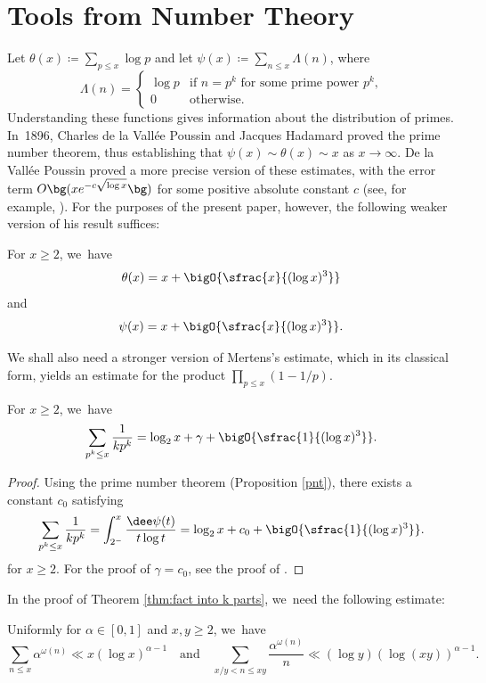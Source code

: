 \section{Tools from Number Theory}
\label{sec:prel}

Let $\theta(x) \coloneqq \sum_{p \le x} \log p$ and let $\psi(x) \coloneqq \sum_{n \le x} \Lambda(n)$, where
\[
\Lambda(n) = \begin{cases}
\log p &\text{if $n = p^k$ for some prime power $p^k$,} \\
0 &\text{otherwise.}
\end{cases}
\]
Understanding these functions gives information about the distribution of primes. In~1896, Charles de la Vallée Poussin and Jacques Hadamard proved the prime number theorem, thus establishing that $\psi(x)\sim\theta(x)\sim x$ as $x\to\infty$. De la Vallée Poussin proved a more precise version of these estimates, with the error term $O\bg(xe^{-c\sqrt{\log x}}\bg)$ for some positive absolute constant $c$ (see, for example, \cite[Ch.\,8]{Koukoulo19}). For the purposes of the present paper, however, the following weaker version of his result suffices:

\begin{prop}
\label{pnt}
For $x \ge 2$, we~have
\[
\theta(x) = x + \bigO{\sfrac{x}{(\log x)^3}}
\]
and
\[
\psi(x) = x+\bigO{\sfrac{x}{(\log x)^3}}.
\]
\end{prop}

We shall also need a stronger version of Mertens's estimate, which in its classical form, yields an estimate for the product $\prod_{p \le x} (1-1/p)$.

\begin{prop}
\label{prop:mertens}
For $x \ge 2$, we~have
\[
\sum_{p^k \le x} \frac{1}{kp^k} = \log_2 x + \gamma + \bigO{\sfrac{1}{(\log x)^3}}.
\]
\end{prop}

\begin{proof}
Using the prime number theorem (Proposition \ref{pnt}), there exists a constant $c_0$ satisfying
\[
\sum_{p^k \le x} \frac{1}{kp^k} = \int_{2^-}^x \frac{\dee \psi(t)}{t\log t} = \log_2 x + c_0 + \bigO{\sfrac{1}{(\log x)^3}}.
\]
for $x \ge 2$. For the proof of $\gamma = c_0$, see the proof of \cite[Th.\,2.7]{MV07}.
\end{proof}

In the proof of Theorem \ref{thm:fact into k parts}, we~need the following estimate:
\begin{prop}
\label{prel:partial summation bounds}
Uniformly for $\alpha\in[0,1]$ and $x,y\ge2$, we~have
\[
\sum_{n \le x} \alpha^{\omega(n)} \ll x(\log x)^{\alpha-1}
\quad \text{and} \quad \sum_{x/y<n \le xy} \frac{ \alpha^{\omega(n)}}{n} \ll (\log y)(\log(xy))^{\alpha-1}.
\]
\end{prop}

